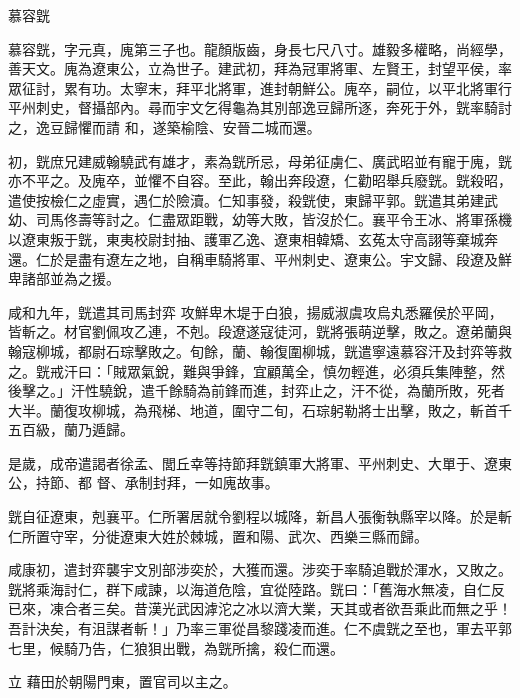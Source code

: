
\begin{pinyinscope}

 慕容皝



 慕容皝，字元真，廆第三子也。龍顏版齒，身長七尺八寸。雄毅多權略，尚經學，善天文。廆為遼東公，立為世子。建武初，拜為冠軍將軍、左賢王，封望平侯，率眾征討，累有功。太寧末，拜平北將軍，進封朝鮮公。廆卒，嗣位，以平北將軍行平州刺史，督攝部內。尋而宇文乞得龜為其別部逸豆歸所逐，奔死于外，皝率騎討之，逸豆歸懼而請
 和，遂築榆陰、安晉二城而還。



 初，皝庶兄建威翰驍武有雄才，素為皝所忌，母弟征虜仁、廣武昭並有寵于廆，皝亦不平之。及廆卒，並懼不自容。至此，翰出奔段遼，仁勸昭舉兵廢皝。皝殺昭，遣使按檢仁之虛實，遇仁於險瀆。仁知事發，殺皝使，東歸平郭。皝遣其弟建武幼、司馬佟壽等討之。仁盡眾距戰，幼等大敗，皆沒於仁。襄平令王冰、將軍孫機以遼東叛于皝，東夷校尉封抽、護軍乙逸、遼東相韓矯、玄菟太守高詡等棄城奔還。仁於是盡有遼左之地，自稱車騎將軍、平州刺史、遼東公。宇文歸、段遼及鮮卑諸部並為之援。



 咸和九年，皝遣其司馬封弈
 攻鮮卑木堤于白狼，揚威淑虞攻烏丸悉羅侯於平岡，皆斬之。材官劉佩攻乙連，不剋。段遼遂寇徒河，皝將張萌逆擊，敗之。遼弟蘭與翰寇柳城，都尉石琮擊敗之。旬餘，蘭、翰復圍柳城，皝遣寧遠慕容汗及封弈等救之。皝戒汗曰：「賊眾氣銳，難與爭鋒，宜顧萬全，慎勿輕進，必須兵集陣整，然後擊之。」汗性驍銳，遣千餘騎為前鋒而進，封弈止之，汗不從，為蘭所敗，死者大半。蘭復攻柳城，為飛梯、地道，圍守二旬，石琮躬勒將士出擊，敗之，斬首千五百級，蘭乃遁歸。



 是歲，成帝遣謁者徐孟、閭丘幸等持節拜皝鎮軍大將軍、平州刺史、大單于、遼東公，持節、都
 督、承制封拜，一如廆故事。



 皝自征遼東，剋襄平。仁所署居就令劉程以城降，新昌人張衡執縣宰以降。於是斬仁所置守宰，分徙遼東大姓於棘城，置和陽、武次、西樂三縣而歸。



 咸康初，遣封弈襲宇文別部涉奕於，大獲而還。涉奕于率騎追戰於渾水，又敗之。皝將乘海討仁，群下咸諫，以海道危陰，宜從陸路。皝曰：「舊海水無凌，自仁反已來，凍合者三矣。昔漢光武因滹沱之冰以濟大業，天其或者欲吾乘此而無之乎！吾計決矣，有沮謀者斬！」乃率三軍從昌黎踐凌而進。仁不虞皝之至也，軍去平郭七里，候騎乃告，仁狼狽出戰，為皝所擒，殺仁而還。



 立
 藉田於朝陽門東，置官司以主之。




\end{pinyinscope}
